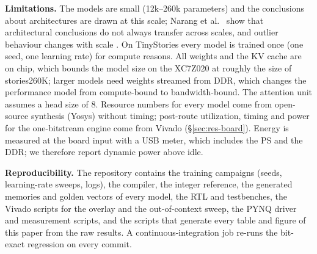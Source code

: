 

\textbf{Limitations.} The models are small (12k--260k parameters) and the conclusions about architectures are drawn at
this scale; Narang et al.\ \cite{narang2021transformer} show that architectural conclusions do not always transfer across
scales, and outlier behaviour changes with scale \cite{dettmers2022llmint8}. On TinyStories every model is trained once
(one seed, one learning rate) for compute reasons. All weights and the KV cache are on chip, which bounds the model size on
the XC7Z020 at roughly the size of stories260K; larger models need weights streamed from DDR, which changes the
performance model from compute-bound to bandwidth-bound. The attention unit assumes a head size of 8. Resource numbers
for every model come from open-source synthesis (Yosys) without timing; post-route utilization, timing and power for the
one-bitstream engine come from Vivado (\S\ref{sec:res-board}). Energy is measured at the board input with a USB meter,
which includes the PS and the DDR; we therefore report dynamic power above idle.

\textbf{Reproducibility.} The repository contains the training campaigns (seeds, learning-rate sweeps, logs), the
compiler, the integer reference, the generated memories and golden vectors of every model, the RTL and testbenches, the
Vivado scripts for the overlay and the out-of-context sweep, the PYNQ driver and measurement scripts, and the scripts that
generate every table and figure of this paper from the raw results. A continuous-integration job re-runs the bit-exact
regression on every commit.
